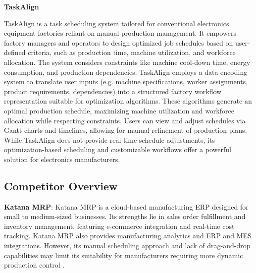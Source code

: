 
\begin{table}[!htbp]
    \textbf{TaskAlign}
\end{table}

TaskAlign is a task scheduling system tailored for conventional electronics equipment factories reliant on manual production management. It empowers factory managers and operators to design optimized job schedules based on user-defined criteria, such as production time, machine utilization, and workforce allocation. The system considers constraints like machine cool-down time, energy consumption, and production dependencies. TaskAlign employs a data encoding system to translate user inputs (e.g. machine specifications, worker assignments, product requirements, dependencies) into a structured factory workflow representation suitable for optimization algorithms. These algorithms generate an optimal production schedule, maximizing machine utilization and workforce allocation while respecting constraints. Users can view and adjust schedules via Gantt charts and timelines, allowing for manual refinement of production plans. While TaskAlign does not provide real-time schedule adjustments, its optimization-based scheduling and customizable workflows offer a powerful solution for electronics manufacturers.

\subsection{Competitor Overview}

\textbf{Katana MRP}: Katana MRP is a cloud-based manufacturing ERP designed for small to medium-sized businesses. Its strengths lie in sales order fulfillment and inventory management, featuring e-commerce integration and real-time cost tracking. Katana MRP also provides manufacturing analytics and ERP and MES integrations. However, its manual scheduling approach and lack of drag-and-drop capabilities may limit its suitability for manufacturers requiring more dynamic production control \cite{katana_mrp}.

